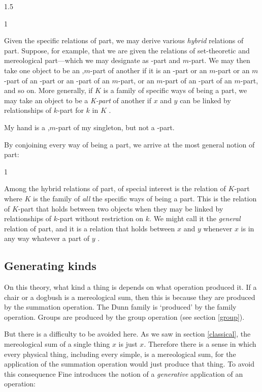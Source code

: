 \documentclass[11pt]{article}
\newenvironment{squote}{%
\begin{spacing}{1}
\begin{list}{}{%
\setlength{\labelwidth}{0pt}%
\rightmargin\leftmargin%
}
\item\relax
}{%
\end{list}%
\end{spacing}
}
\begin{document}
\begin{spacing}{1.5}
\begin{squote}
Given the specific relations of part, we may derive various {\em
  hybrid} relations of part.  Suppose, for example, that we are given
the relations of set-theoretic and mereological part---which we may
designate as \textepsilon -part and $m$-part. We may then take one
object to be an \textepsilon ,$m$-part of another if it is an
\textepsilon -part or an $m$-part or an $m$-part of an \textepsilon
-part or an \textepsilon -part of an $m$-part, or an $m$-part of an
\textepsilon -part of an $m$-part, and so on. More generally, if $K$
is a family of specific ways of being a part, we may take an object to
be a {\em K-part} of another if $x$ and $y$ can be linked by
relationships of $k$-part for $k$ in $K$ \citep[579]{fine2010}.
\end{squote}

My hand is a \textepsilon ,$m$-part of my singleton, but not a
\textepsilon -part.

By conjoining every way of being a part, we arrive at the most general
notion of part:

\begin{squote}
Among the hybrid relations of part, of special interest is the
relation of $K$-part where $K$ is the family of {\em all} the specific
ways of being a part.  This is the relation of $K$-part that holds
between two objects when they may be linked by relationships of
$k$-part without restriction on $k$.  We might call it the {\em
  general} relation of part, and it is a relation that holds between
$x$ and $y$ whenever $x$ is in any way whatever a part of $y$
\citep[580]{fine2010}.
\end{squote}

\subsection{Generating kinds}
\label{generate}
On this theory, what kind a thing is depends on what operation
produced it.  If a chair or a dogbush is a mereological sum, then this
is because they are produced by the summation operation.  The Dunn
family is `produced' by the family operation.  Groups are produced by
the group operation (see section \ref{group}).

But there is a difficulty to be avoided here.  As we saw in section
\ref{classical}, the mereological sum of a single thing $x$ is just
$x$.  Therefore there is a sense in which every physical thing,
including every simple, is a mereological sum, for the application of
the summation operation would just produce that thing.  To avoid this
consequence Fine introduces the notion of a {\em generative}
application of an operation:


\end{spacing}
\end{document}
